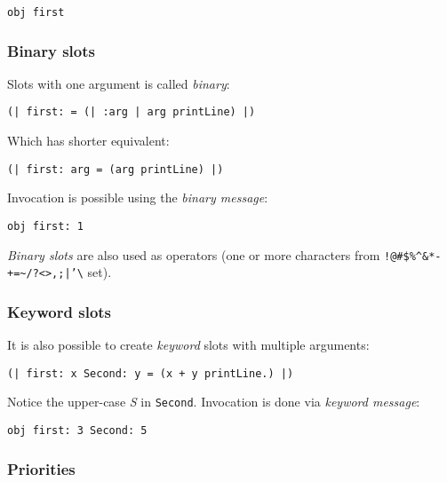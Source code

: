 \documentclass[10pt]{article}
\begin{document}
\begin{multicols*}{3}
\begin{lstlisting}
obj first
\end{lstlisting}



\subsubsection{Binary slots}

Slots with one argument is called \textit{binary}:

\begin{lstlisting}
(| first: = (| :arg | arg printLine) |)
\end{lstlisting}

Which has shorter equivalent:

\begin{lstlisting}
(| first: arg = (arg printLine) |)
\end{lstlisting}

Invocation is possible using the \textit{binary message}:

\begin{lstlisting}
obj first: 1
\end{lstlisting}

\textit{Binary slots} are also used as operators (one or more characters from \texttt{!@\#\$\%\^{}\&*-+=\textasciitilde/?\textless\textgreater,;|'\textbackslash{}} set).



\subsubsection{Keyword slots}

It is also possible to create \textit{keyword} slots with multiple arguments:

\begin{lstlisting}
(| first: x Second: y = (x + y printLine.) |)
\end{lstlisting}

Notice the upper-case \textit{S} in \texttt{Second}. Invocation is done via \textit{keyword message}:

\begin{lstlisting}
obj first: 3 Second: 5
\end{lstlisting}



\subsubsection{Priorities}


\end{multicols*}
\end{document}
